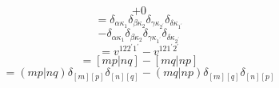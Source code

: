 \documentclass[12pt]{article}
\begin{document}
\begin{equation}
    +0
\end{equation}
\begin{equation}
    =\delta _{\alpha  \kappa _{1}}\delta _{\beta  \kappa _{2}}\delta _{\gamma  \kappa _{2^{\prime}}}\delta _{\delta  \kappa _{1^{\prime}}}
\end{equation}
\begin{equation}
    -\delta _{\alpha  \kappa _{1}}\delta _{\beta  \kappa _{2}}\delta _{\gamma  \kappa _{1^{\prime}}}\delta _{\delta  \kappa _{2^{\prime}}}
\end{equation}
\begin{equation}
    =v^{122^{\prime}1^{\prime}}-v^{121^{\prime}2^{\prime}}
\end{equation}
\begin{equation}
    =[mp|nq]-[mq|np]
\end{equation}
\begin{equation}
    =(mp|nq)\delta _{[m][p]}\delta _{[n][q]}-(mq|np)\delta _{[m][q]}\delta _{[n][p]}
\end{equation}
    
\end{document}
